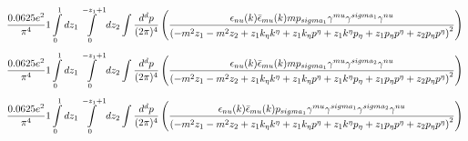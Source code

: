 \begin{dmath}\frac{0.0625 e^{2}}{\pi^{4}}1\int\limits_{ 0 }^{ 1 } d{ z_{ 1 } }\int\limits_{ 0 }^{ - { z_{ 1 } } + 1 } d{ z_{ 2 } }\int\frac{d^d p }{ (2\pi)^4 }\left(\frac{\epsilon_{ \\nu }({ k }) \bar{\epsilon}_{ \\mu }({ k }) m { { p }_{ \\sigma_1 } } { \gamma^{ \\mu } } { \gamma^{ \\sigma_1 } } { \gamma^{ \\nu } }}{\left(- m^{2} { z_{ 1 } } - m^{2} { z_{ 2 } } + { z_{ 1 } } { { k }_{ \eta } } { { k }^{ \eta } } + { z_{ 1 } } { { k }_{ \eta } } { { p }^{ \eta } } + { z_{ 1 } } { { k }^{ \eta } } { { p }_{ \eta } } + { z_{ 1 } } { { p }_{ \eta } } { { p }^{ \eta } } + { z_{ 2 } } { { p }_{ \eta } } { { p }^{ \eta } }\right)^{2}}\right)\end{dmath}
\begin{dmath}\frac{0.0625 e^{2}}{\pi^{4}}1\int\limits_{ 0 }^{ 1 } d{ z_{ 1 } }\int\limits_{ 0 }^{ - { z_{ 1 } } + 1 } d{ z_{ 2 } }\int\frac{d^d p }{ (2\pi)^4 }\left(\frac{\epsilon_{ \\nu }({ k }) \bar{\epsilon}_{ \\mu }({ k }) m { { p }_{ \\sigma_1 } } { \gamma^{ \\mu } } { \gamma^{ \\sigma_2 } } { \gamma^{ \\nu } }}{\left(- m^{2} { z_{ 1 } } - m^{2} { z_{ 2 } } + { z_{ 1 } } { { k }_{ \eta } } { { k }^{ \eta } } + { z_{ 1 } } { { k }_{ \eta } } { { p }^{ \eta } } + { z_{ 1 } } { { k }^{ \eta } } { { p }_{ \eta } } + { z_{ 1 } } { { p }_{ \eta } } { { p }^{ \eta } } + { z_{ 2 } } { { p }_{ \eta } } { { p }^{ \eta } }\right)^{2}}\right)\end{dmath}
\begin{dmath}\frac{0.0625 e^{2}}{\pi^{4}}1\int\limits_{ 0 }^{ 1 } d{ z_{ 1 } }\int\limits_{ 0 }^{ - { z_{ 1 } } + 1 } d{ z_{ 2 } }\int\frac{d^d p }{ (2\pi)^4 }\left(\frac{\epsilon_{ \\nu }({ k }) \bar{\epsilon}_{ \\mu }({ k }) { { p }_{ \\sigma_1 } } { \gamma^{ \\mu } } { \gamma^{ \\sigma_1 } } { \gamma^{ \\sigma_2 } } { \gamma^{ \\nu } }}{\left(- m^{2} { z_{ 1 } } - m^{2} { z_{ 2 } } + { z_{ 1 } } { { k }_{ \eta } } { { k }^{ \eta } } + { z_{ 1 } } { { k }_{ \eta } } { { p }^{ \eta } } + { z_{ 1 } } { { k }^{ \eta } } { { p }_{ \eta } } + { z_{ 1 } } { { p }_{ \eta } } { { p }^{ \eta } } + { z_{ 2 } } { { p }_{ \eta } } { { p }^{ \eta } }\right)^{2}}\right)\end{dmath}
